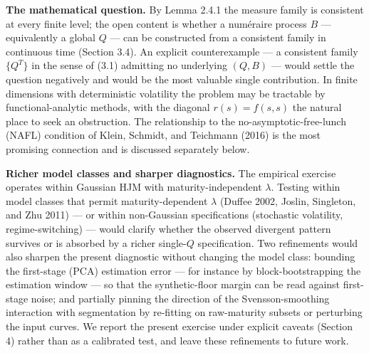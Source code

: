 \documentclass[
]{article}
\begin{document}
\textbf{The mathematical question.} By Lemma 2.4.1 the measure family is
consistent at every finite level; the open content is whether a
numéraire process \(B\) --- equivalently a global \(Q\) --- can be
constructed from a consistent family in continuous time (Section 3.4).
An explicit counterexample --- a consistent family \(\{Q^T\}\) in the
sense of (3.1) admitting no underlying \((Q, B)\) --- would settle the
question negatively and would be the most valuable single contribution.
In finite dimensions with deterministic volatility the problem may be
tractable by functional-analytic methods, with the diagonal
\(r(s) = f(s,s)\) the natural place to seek an obstruction. The
relationship to the no-asymptotic-free-lunch (NAFL) condition of Klein,
Schmidt, and Teichmann (2016) is the most promising connection and is
discussed separately below.

\textbf{Richer model classes and sharper diagnostics.} The empirical
exercise operates within Gaussian HJM with maturity-independent
\(\lambda\). Testing within model classes that permit maturity-dependent
\(\lambda\) (Duffee 2002, Joslin, Singleton, and Zhu 2011) --- or within
non-Gaussian specifications (stochastic volatility, regime-switching)
--- would clarify whether the observed divergent pattern survives or is
absorbed by a richer single-\(Q\) specification. Two refinements would
also sharpen the present diagnostic without changing the model class:
bounding the first-stage (PCA) estimation error --- for instance by
block-bootstrapping the estimation window --- so that the
synthetic-floor margin can be read against first-stage noise; and
partially pinning the direction of the Svensson-smoothing interaction
with segmentation by re-fitting on raw-maturity subsets or perturbing
the input curves. We report the present exercise under explicit caveats
(Section 4) rather than as a calibrated test, and leave these
refinements to future work.
\end{document}
